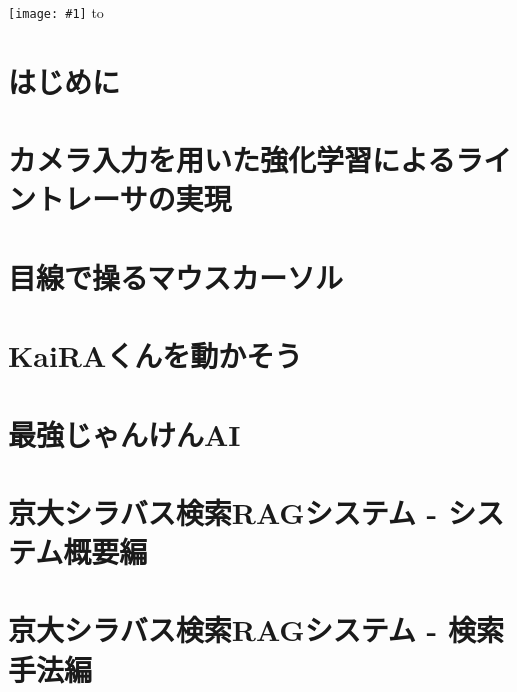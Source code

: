 \documentclass[dvipdfmx,openany]{jsbook}
\makeatletter
\numberwithin{equation}{section}     %
\def\@haikei#1{
\setbox\BackGroundUnit\hbox{\texttt{[image: \#1]}}
\@tempdima\paperheight
\advance\@tempdima\ht\BackGroundUnit\advance\@tempdima\dp\BackGroundUnit
\setbox\BackGround\vbox to \@tempdima{
        \@tempdima=\paperwidth\advance\@tempdima\wd\BackGroundUnit
        \leaders\hbox to\@tempdima{\leaders\copy\BackGroundUnit\hfil}\vfil
}
\wd\BackGround=0pt\ht\BackGround=0pt\dp\BackGround=0pt
}
\newcommand{\incluedefullgraphics}[1]{\pagestyle{empty}\@haikei{#1}\null}
\makeatother
\begin{document}
\begin{titlepage}
  \thispagestyle{empty}
  \incluedefullgraphics{cover.png}
\end{titlepage}

\chapter*{はじめに}


\tableofcontents

\chapter{カメラ入力を用いた強化学習によるライントレーサの実現}\label{chap:line-tracer}


\chapter{目線で操るマウスカーソル}\label{chap:eye-track-cursor}


\chapter{KaiRAくんを動かそう}\label{chap:moving-kaira-kun}


\chapter{最強じゃんけんAI}\label{chap:no-lose-janken}


\chapter{京大シラバス検索RAGシステム - システム概要編}\label{chap:syllabus-rag-overview}


\chapter{京大シラバス検索RAGシステム - 検索手法編}\label{chap:syllabus-rag-search}




\nocite{*}
\end{document}
